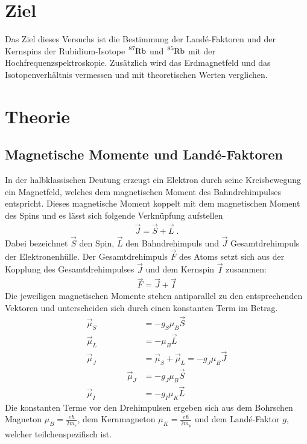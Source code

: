 \section{Ziel}
Das Ziel dieses Versuchs ist die Bestimmung der Land\'{e}-Faktoren und der Kernspins der Rubidium-Isotope $\ce{^{87}_{}Rb}$ und $\ce{^{85}_{}Rb}$ mit der Hochfrequenzspektroskopie.
Zusätzlich wird das Erdmagnetfeld und das Isotopenverhältnis vermessen und mit theoretischen Werten verglichen.

\section{Theorie}
\label{sec:Theorie}

\subsection{Magnetische Momente und Land\'{e}-Faktoren}
\label{sec:magnetischeMomente}

In der halbklassischen Deutung erzeugt ein Elektron durch seine Kreisbewegung ein Magnetfeld, welches dem magnetischen Moment des Bahndrehimpulses entspricht.
Dieses magnetische Moment koppelt mit dem magnetischen Moment des Spins und es lässt sich folgende Verknüpfung aufstellen
\begin{align}
	\vec{J} = \vec{S} + \vec{L} \;.
	\label{eq:SplusL}
\end{align}
Dabei bezeichnet $\vec{S}$ den Spin, $\vec{L}$ den Bahndrehimpuls und $\vec{J}$ Gesamtdrehimpuls der Elektronenhülle.
Der Gesamtdrehimpuls $\vec{F}$ des Atoms setzt sich aus der Kopplung des Gesamtdrehimpulses $\vec{J}$ und dem Kernspin $\vec{I}$ zusammen:
\begin{align}
	\vec{F} = \vec{J} + \vec{I}
	\label{eq:JplusL}
\end{align}
Die jeweiligen magnetischen Momente stehen antiparallel zu den entsprechenden Vektoren und unterscheiden sich durch einen konstanten Term im Betrag.
\begin{align}
	\vec{\mu}_S&=-g_S\mu_B\vec{S}\\
	\vec{\mu}_L&=-\mu_B\vec{L}\\
	\vec{\mu}_J&=\vec{\mu}_S+\vec{\mu}_L=-g_J\mu_B\vec{J}\\
	\hspace{2cm}
	\vec{\mu}_J&=-g_J\mu_B\vec{S}\\
	\vec{\mu}_I&=-g_I\mu_K\vec{L}
	\label{eq:mu}
\end{align}
Die konstanten Terme vor den Drehimpulsen ergeben sich aus dem Bohrschen Magneton $\mu_B=\frac{e\hbar}{2m_e}$, dem Kernmagneton $\mu_K=\frac{e\hbar}{2m_p}$ und dem Land\'{e}-Faktor $g$, welcher teilchenspezifisch ist.\\

